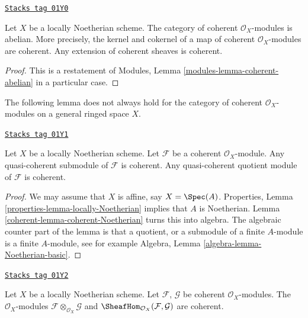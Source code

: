 \begin{lemma}
\label{coherent-lemma-coherent-abelian-Noetherian}
\href{https://stacks.math.columbia.edu/tag/01Y0}{\texttt{Stacks tag 01Y0}}

Let $X$ be a locally Noetherian scheme.
The category of coherent $\mathcal{O}_X$-modules is abelian.
More precisely, the kernel and cokernel of a map of coherent
$\mathcal{O}_X$-modules are coherent. Any extension
of coherent sheaves is coherent.
\end{lemma}

\begin{proof}
This is a restatement of
Modules, Lemma \ref{modules-lemma-coherent-abelian}
in a particular case.
\end{proof}

The following lemma does not always hold for the category of coherent
$\mathcal{O}_X$-modules on a general ringed space $X$.

\begin{lemma}
\label{coherent-lemma-coherent-Noetherian-quasi-coherent-sub-quotient}
\href{https://stacks.math.columbia.edu/tag/01Y1}{\texttt{Stacks tag 01Y1}}

Let $X$ be a locally Noetherian scheme.
Let $\mathcal{F}$ be a coherent $\mathcal{O}_X$-module.
Any quasi-coherent submodule of $\mathcal{F}$ is coherent.
Any quasi-coherent quotient module of $\mathcal{F}$ is coherent.
\end{lemma}

\begin{proof}

We may assume that $X$ is affine, say $X = \Spec(A)$.
Properties, Lemma \ref{properties-lemma-locally-Noetherian}
implies that $A$ is Noetherian. Lemma \ref{coherent-lemma-coherent-Noetherian}
turns this into algebra. The algebraic counter part of
the lemma is that a quotient, or a submodule of a finite $A$-module
is a finite $A$-module, see for example
Algebra, Lemma \ref{algebra-lemma-Noetherian-basic}.
\end{proof}

\begin{lemma}
\label{coherent-lemma-tensor-hom-coherent}
\href{https://stacks.math.columbia.edu/tag/01Y2}{\texttt{Stacks tag 01Y2}}

Let $X$ be a locally Noetherian scheme.
Let $\mathcal{F}$, $\mathcal{G}$ be coherent $\mathcal{O}_X$-modules.
The $\mathcal{O}_X$-modules $\mathcal{F} \otimes_{\mathcal{O}_X} \mathcal{G}$
and $\SheafHom_{\mathcal{O}_X}(\mathcal{F}, \mathcal{G})$ are
coherent.
\end{lemma}

